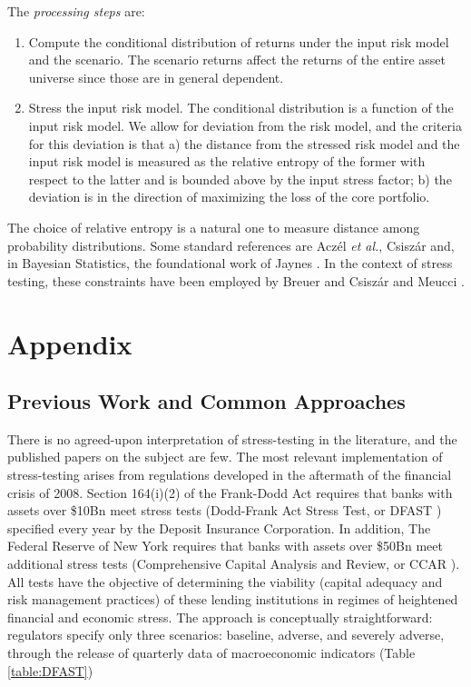 \documentclass[letter, 12pt]{article}
\newcommand{\etal}{\emph{et al.}}
\begin{document}
The \emph{processing steps} are:
\begin{enumerate}
	\item Compute the conditional distribution of returns under the input risk model and the scenario. The scenario returns affect the returns of the entire asset universe since those are in general dependent.
	\item Stress the input risk model. The conditional distribution is a function of the input risk model. We allow for deviation from the risk model, and the criteria for this deviation is that a) the distance from the stressed risk model and the input risk model is measured as the relative entropy of the former with respect to the latter and is bounded above by the input stress factor; b) the deviation is in the direction of maximizing the loss of the core portfolio.
\end{enumerate}
The choice of relative entropy is a natural one to measure distance among probability distributions. Some standard references are Acz{\'e}l \etal \cite{aczel1974},  Csisz{\'a}r \cite{csiszar1991, csiszar2008} and, in Bayesian Statistics, the foundational work of Jaynes \cite{jaines2003}. In the context of stress testing, these constraints have been employed by Breuer and Csisz{\'a}r \cite{breuer2013, breuer2016} and Meucci \cite{meucci2008}.
\section{Appendix}
\subsection{Previous Work and Common Approaches}

There is no agreed-upon interpretation of stress-testing in the literature, and the published papers on the subject are few. The most relevant implementation of stress-testing arises from regulations developed in the aftermath of the financial crisis of 2008. Section 164(i)(2) of the Frank-Dodd Act requires that banks with assets over \$10Bn meet stress tests (Dodd-Frank Act Stress Test, or DFAST \cite{fed2013}) specified every year by the Deposit Insurance Corporation. In addition, The Federal Reserve of New York requires that banks with assets over \$50Bn meet additional stress tests (Comprehensive Capital Analysis and Review, or CCAR \cite{fed2017, fed2018}). All tests have the objective of determining the viability (capital adequacy and risk management practices) of these lending institutions in regimes of heightened financial and economic stress. The approach is conceptually straightforward: regulators specify only three scenarios: baseline, adverse, and severely adverse, through the release of quarterly data of macroeconomic indicators (Table \ref{table:DFAST})
\end{document}
